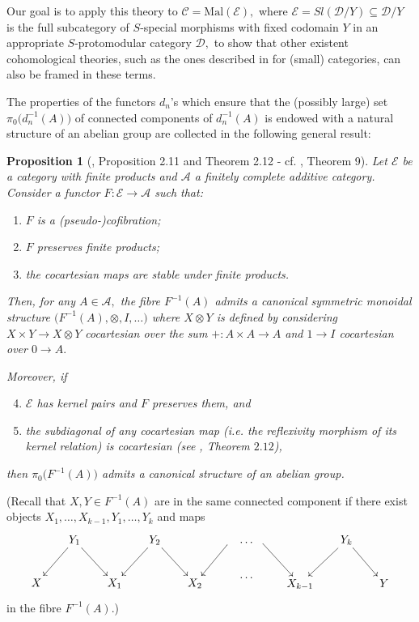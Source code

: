 \documentclass[11pt]{amsart}
\theoremstyle{plain}
\newtheorem{proposition}[subsubsection]{Proposition}
\theoremstyle{definition}
\theoremstyle{remark}
\begin{document}
Our goal is to apply this theory to $\mathcal{C}=\mathrm{Mal}(\mathcal{E}),$ where $\mathcal{E}=Sl(\mathcal{D}/Y)\subseteq \mathcal{D}/Y$ is the full subcategory of $S$-special morphisms with fixed codomain $Y$ in an appropriate $S$-protomodular category $\mathcal{D},$ to show that other existent cohomological theories, such as the ones described in \cite{golasinski, hoff} for (small) categories, can also be framed in these terms.

The properties of the functors $d_n$'s which ensure that the (possibly large) set $\pi_0\big(d_n^{-1}(A)\big)$ of connected components of $d_n^{-1}(A)$ is endowed with a natural structure of an abelian group are collected in the following general result:
\begin{proposition}[{\cite{bourn-rodelo}, Proposition 2.11 and Theorem 2.12} - cf. \cite{baer-sums}, Theorem 9]
\label{prop:fibres_abelian_groups}
Let $\mathcal{E}$ be a category with finite products and $\mathcal{A}$ a finitely complete additive category. Consider a functor $F\colon\mathcal{E}\rightarrow\mathcal{A}$ such that:
\begin{enumerate}
\item $F$ is a (pseudo-)cofibration;
\item $F$ preserves finite products;
\item the cocartesian maps are stable under finite products.
\end{enumerate}
Then, for any $A\in\mathcal{A},$ the fibre $F^{-1}(A)$ admits a canonical symmetric monoidal structure $\big(F^{-1}(A),\otimes,I,\dots\big)$ where $X\otimes Y$ is defined by considering $X\times Y\rightarrow X\otimes Y$ cocartesian over the sum $+:A\times A\rightarrow A$ and $1\rightarrow I$ cocartesian over $0\rightarrow A.$

Moreover, if
\begin{enumerate}\setcounter{enumi}{3}
\item $\mathcal{E}$ has kernel pairs and $F$ preserves them, and
\item the subdiagonal of any cocartesian map (i.e. the reflexivity morphism of its kernel relation) is cocartesian (see \cite{bourn-rodelo}, Theorem $2.12$),
\end{enumerate}
then $\pi_0\big(F^{-1}(A)\big)$ admits a canonical structure of an abelian group.
\end{proposition}
(Recall that $X,Y\in F^{-1}(A)$ are in the same connected component if there exist objects $X_1,\dots,X_{k-1},Y_1,\dots,Y_k$ and maps
\begin{equation}
\begin{aligned}
\label{eqn:zig-zag}
{
\xymatrixcolsep{1.5pc}
\xymatrix{
 &{Y_1} \ar[dl] \ar[dr] &\ &{Y_2} \ar[dl] \ar[dr] &\ &\ \ar[dl] \\
X &\ &{X_1} &\ &{X_2} &\
}
}
\xymatrix{
{\dots}\\
{\dots}
}
{
\xymatrixcolsep{1.5pc}
\xymatrix{
\ar[rd]  &\ &{Y_k} \ar[dl] \ar[dr] &\ \\
&{X_{k-1}} &\ &Y
}
}
\end{aligned}
\end{equation}
in the fibre $F^{-1}(A).$)
\end{document}
